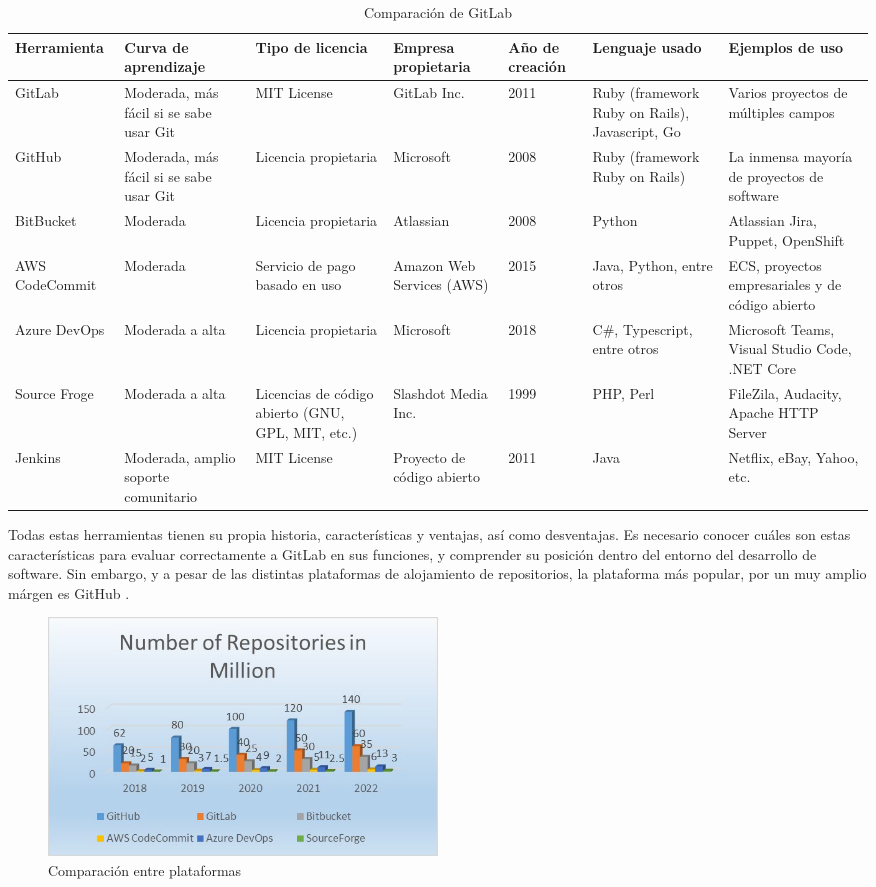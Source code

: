 \documentclass[runningheads]{llncs}
\begin{document}
\begin{table}
        \centering
        \caption{Comparación de GitLab}
        \begin{tabularx}{1.1\textwidth}{X || X | X | X | X | X | X}
            Herramienta & Curva de aprendizaje & Tipo de licencia & Empresa propietaria & Año de creación & Lenguaje usado & Ejemplos de uso \\
            \hline
            \hline
            GitLab & Moderada, más fácil si se sabe usar Git & MIT License & GitLab Inc. & 2011 & Ruby (framework Ruby on Rails), Javascript, Go & Varios proyectos de múltiples campos\\
            GitHub & Moderada, más fácil si se sabe usar Git & Licencia propietaria & Microsoft & 2008 & Ruby (framework Ruby on Rails) & La inmensa mayoría de proyectos de software\\
            BitBucket & Moderada & Licencia propietaria & Atlassian & 2008 & Python & Atlassian Jira, Puppet, OpenShift\\
            AWS CodeCommit & Moderada & Servicio de pago basado en uso & Amazon Web Services (AWS) & 2015 & Java, Python, entre otros & ECS, proyectos empresariales y de código abierto\\
            Azure DevOps & Moderada a alta & Licencia propietaria & Microsoft & 2018 & C\#, Typescript, entre otros & Microsoft Teams, Visual Studio Code, .NET Core\\
            Source Froge & Moderada a alta & Licencias de código abierto (GNU, GPL, MIT, etc.) & Slashdot Media Inc. & 1999 & PHP, Perl & FileZila, Audacity, Apache HTTP Server\\
            Jenkins & Moderada, amplio soporte comunitario & MIT License & Proyecto de código abierto & 2011 & Java & Netflix, eBay, Yahoo, etc.\\
            \hline
        \end{tabularx}
        \label{table:3}
\end{table}
Todas estas herramientas tienen su propia historia, características y ventajas, así como desventajas. Es necesario conocer cuáles son estas características para
evaluar correctamente a GitLab en sus funciones, y comprender su posición dentro del entorno del desarrollo de software. Sin embargo, y a pesar de las distintas
plataformas de alojamiento de repositorios, la plataforma más popular, por un muy amplio márgen es GitHub \cite{uddin2023comparative}.
\begin{figure}[htbp]
        \centering
        \includegraphics[width=0.5\textwidth]{Comp-rep.png}
        \caption{Comparación entre plataformas}
        \label{fig:comp-rep}
\end{figure}
\end{document}

